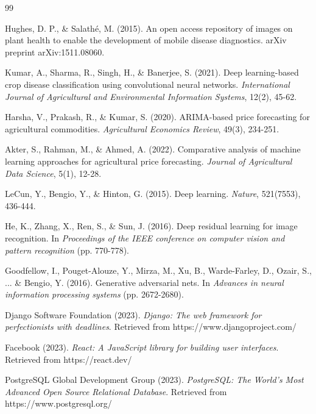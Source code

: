 \documentclass[12pt,a4paper]{report}
\begin{document}
\begin{thebibliography}{99}

Hughes, D. P., \& Salathé, M. (2015). An open access repository of images on plant health to enable the development of mobile disease diagnostics. arXiv preprint arXiv:1511.08060.

Kumar, A., Sharma, R., Singh, H., \& Banerjee, S. (2021). Deep learning-based crop disease classification using convolutional neural networks. \textit{International Journal of Agricultural and Environmental Information Systems}, 12(2), 45-62.

Harsha, V., Prakash, R., \& Kumar, S. (2020). ARIMA-based price forecasting for agricultural commodities. \textit{Agricultural Economics Review}, 49(3), 234-251.

Akter, S., Rahman, M., \& Ahmed, A. (2022). Comparative analysis of machine learning approaches for agricultural price forecasting. \textit{Journal of Agricultural Data Science}, 5(1), 12-28.

LeCun, Y., Bengio, Y., \& Hinton, G. (2015). Deep learning. \textit{Nature}, 521(7553), 436-444.

He, K., Zhang, X., Ren, S., \& Sun, J. (2016). Deep residual learning for image recognition. In \textit{Proceedings of the IEEE conference on computer vision and pattern recognition} (pp. 770-778).

Goodfellow, I., Pouget-Alouze, Y., Mirza, M., Xu, B., Warde-Farley, D., Ozair, S., ... \& Bengio, Y. (2016). Generative adversarial nets. In \textit{Advances in neural information processing systems} (pp. 2672-2680).

Django Software Foundation (2023). \textit{Django: The web framework for perfectionists with deadlines}. Retrieved from https://www.djangoproject.com/

Facebook (2023). \textit{React: A JavaScript library for building user interfaces}. Retrieved from https://react.dev/

PostgreSQL Global Development Group (2023). \textit{PostgreSQL: The World's Most Advanced Open Source Relational Database}. Retrieved from https://www.postgresql.org/


\end{thebibliography}
\end{document}
